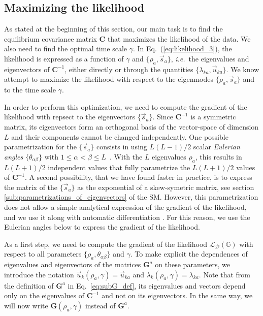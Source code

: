 \documentclass[preprint,amsmath,amssymb,superscriptaddress,showpacs,pre]{revtex4-1}
\newcommand{\ie}{\emph{i.e.}}
\newcommand{\iC}{\bm{C}^{-1}}
\newcommand{\vsa}{\vec{s}_a}
\newcommand{\vuka}{\vec{u}_{ka}}
\begin{document}

\subsection{Maximizing the likelihood} %
\label{sub:maximization_of_the_likelihood}

As stated at the beginning of this section, our main task is to find the equilibrium covariance matrix $\bm C$ that maximizes the likelihood of the data. 
We also need to find the optimal time scale $\gamma$. 
In Eq.~(\eqref{eq:likelihood_3}), the likelihood is expressed as a function of $\gamma$ and $\{\rho_a, \vsa\}$, \ie~the eigenvalues and eigenvectors of $\iC$, either directly or through the quantities $\{\lambda_{ka}, \vuka \}$. 
We know attempt to maximize the likelihood with respect to the eigenmodes $\{\rho_a, \vsa\}$ and to the time scale $\gamma$. 

In order to perform this optimization, we need to compute the gradient of the likelihood with repsect to the eigenvectors $\{\vsa\}$. 
Since $\iC$ is a symmetric matrix, its eigenvectors form an orthogonal basis of the vector-space of dimension $L$ and their components cannot be changed independently.  
One possible parametrization for the $\{\vsa\}$ consists in using $L(L-1)/2$ scalar \emph{Eulerian angles} $\{\theta_{\alpha\beta}\}$ with $1\leq \alpha < \beta \leq L$~\cite{Raffenetti1970GEA, Shepard_param_OM}. 
With the $L$ eigenvalues $\rho_a$, this results in $L(L+1)/2$ independent values that fully parametrize the $L(L+1)/2$ values of $\iC$. 
A second possibility, that we have found faster in practice, is to express the matrix of the $\{\vsa\}$ as the exponential of a skew-symetric matrix, see section \ref{sub:parametrizations_of_eigenvectors} of the SM. 
However, this parametrization does not allow a simple analytical expression of the gradient of the likelihood, and we use it along with automatic differentiation \cite{Zygote.jl-2018}. 
For this reason, we use the Eulerian angles below to express the gradient of the likelihood. 

As a first step, we need to compute the gradient of the likelihood $\mathcal{L}_{\mathcal{D}}(\mathbb{G})$ with respect to all parameters $\{\rho_a, \theta_{\alpha\beta}\}$ and $\gamma$. 
To make explicit the dependences of eigenvalues and eigenvectors of the matrices $\bm G^a$ on these parameters, we introduce the notation $\vec{u}_k(\rho_a,\gamma) = \vuka$ and $\lambda_k(\rho_a,\gamma) = \lambda_{ka}$. 
Note that from the definition of $\bm G^a$ in Eq.~\eqref{eq:subG_def}, its eigenvalues and vectors depend only on the eigenvalues of $\iC$ and not on its eigenvectors. 
In the same way, we will now write $\bm G(\rho_a,\gamma)$ instead of $\bm G^a$. 
\end{document}

